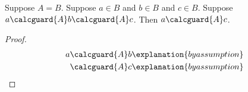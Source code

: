 

\begin{proposition}\label{calculation_transported_conditions}
    Suppose $A=B$.
    Suppose $a\in B$ and $b\in B$ and $c\in B$.
    Suppose $a\calcguard{A}b\calcguard{A}c$.
    Then $a\calcguard{A}c$.
\end{proposition}
\begin{proof}
    \begin{align*}
        a &\calcguard{A}b \explanation{by assumption} \\
          &\calcguard{A}c \explanation{by assumption}
    \end{align*}
\end{proof}
